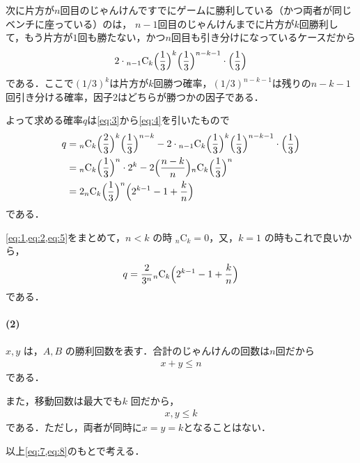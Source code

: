 \documentclass[../../main.tex]{subfiles}
\begin{document}
次に片方が$n$回目のじゃんけんですでにゲームに勝利している（かつ両者が同じベンチに座っている）のは，
$n-1$回目のじゃんけんまでに片方が$k$回勝利して，もう片方が$1$回も勝たない，かつ$n$回目も引き分けになっているケースだから
\begin{align}
  2 \cdot {}_{n-1}\text{C}_{k} \Bigl(\dfrac{1}{3}\Bigr)^k \Bigl(\dfrac{1}{3}\Bigr)^{n-k-1} \cdot \Bigl(\dfrac{1}{3}\Bigr) \label{eq:4}
\end{align}
である．ここで$(1/3)^{k}$は片方が$k$回勝つ確率，$(1/3)^{n-k-1}$は残りの$n-k-1$回引き分ける確率，因子$2$はどちらが勝つかの因子である．

よって求める確率$q$は\cref{eq:3}から\cref{eq:4}を引いたもので
\begin{align}
  q
  &= {}_n\text{C}_k \Bigl(\dfrac{2}{3}\Bigr)^k \Bigl(\dfrac{1}{3}\Bigr)^{n-k} - 2 \cdot {}_{n-1}\text{C}_{k} \Bigl(\dfrac{1}{3}\Bigr)^k \Bigl(\dfrac{1}{3}\Bigr)^{n-k-1} \cdot \Bigl(\dfrac{1}{3}\Bigr) \\
  &= {}_n\text{C}_k \Bigl(\dfrac{1}{3}\Bigr)^n \cdot 2^k - 2 \Bigl(\dfrac{n-k}{n}\Bigr) {}_n\text{C}_k \Bigl(\dfrac{1}{3}\Bigr)^n \\
  &= 2 {}_n\text{C}_k \Bigl(\dfrac{1}{3}\Bigr)^n \Bigl( 2^{k-1} - 1 + \dfrac{k}{n} \Bigr) \label{eq:5}
\end{align}
である．
\casesend

\cref{eq:1,eq:2,eq:5}をまとめて，$n < k$ の時 ${}_n\text{C}_k = 0$，又，$k=1$ の時もこれで良いから，
\begin{align}
  q = \dfrac{2}{3^n} {}_n\text{C}_k \Bigl( 2^{k-1} - 1 + \dfrac{k}{n} \Bigr) \label{eq:6}
\end{align}
である．

\paragraph{(2)}

$x, y$ は，$A, B$ の勝利回数を表す．合計のじゃんけんの回数は$n$回だから
\begin{align}
  x + y \le n \label{eq:7}
\end{align}
である．

また，移動回数は最大でも$k$ 回だから，
\begin{align}
  x, y \le k \label{eq:8}
\end{align}
である．ただし，両者が同時に$x=y=k$となることはない．

以上\cref{eq:7,eq:8}のもとで考える．
\end{document}
